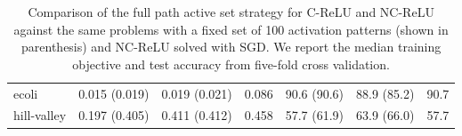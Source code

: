 \begin{table}[t]
\begin{tabular}{lllllll}
		ecoli            & 0.015 (0.019)                          & 0.019 (0.021)                     & 0.086            & 90.6 (90.6)      & 88.9 (85.2)     & 90.7             \\
		hill-valley      & 0.197 (0.405)                          & 0.411 (0.412)                     & 0.458            & 57.7 (61.9)      & 63.9 (66.0)     & 57.7             \\ \bottomrule
	\end{tabular}
	\caption{Comparison of the full path active set strategy for C-ReLU and NC-ReLU against the same problems with a fixed set of 100 activation patterns (shown in parenthesis) and NC-ReLU solved with SGD.
		We report the median training objective and test accuracy from five-fold cross validation.
	}%
	\label{table:active-set-short}
\end{table}
